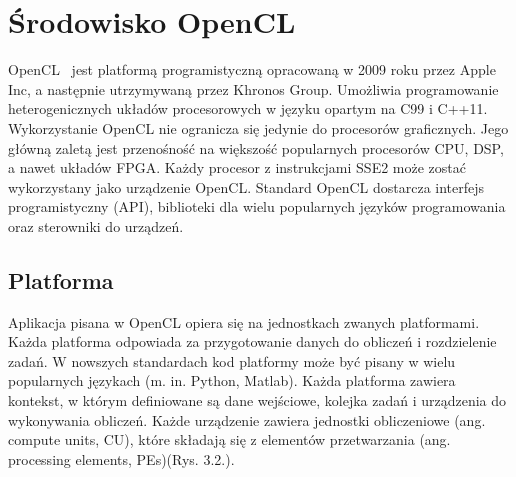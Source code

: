 
\section{Środowisko OpenCL}\label{sec:OpenCL}

OpenCL~\cite{b21} jest platformą programistyczną opracowaną w 2009 roku przez Apple Inc, a następnie utrzymywaną przez Khronos Group. Umożliwia programowanie heterogenicznych układów procesorowych w języku opartym na C99 i C++11. Wykorzystanie OpenCL nie ogranicza się jedynie do procesorów graficznych. Jego główną zaletą jest przenośność na większość popularnych procesorów CPU, DSP, a nawet układów FPGA. Każdy procesor z instrukcjami SSE2 może zostać wykorzystany jako urządzenie OpenCL. Standard OpenCL dostarcza interfejs programistyczny (API), biblioteki dla wielu popularnych języków programowania oraz sterowniki do urządzeń.

\subsection{Platforma}\label{sec:platforma}

Aplikacja pisana w OpenCL opiera się na jednostkach zwanych platformami. Każda platforma odpowiada za przygotowanie danych do obliczeń i rozdzielenie zadań. W nowszych standardach kod platformy może być pisany w wielu popularnych językach  (m. in. Python, Matlab). Każda platforma zawiera kontekst, w którym definiowane są dane wejściowe, kolejka zadań i urządzenia do wykonywania obliczeń. Każde urządzenie zawiera jednostki obliczeniowe (ang. compute units, CU), które składają się z elementów przetwarzania (ang. processing elements, PEs)(Rys. 3.2.). 

